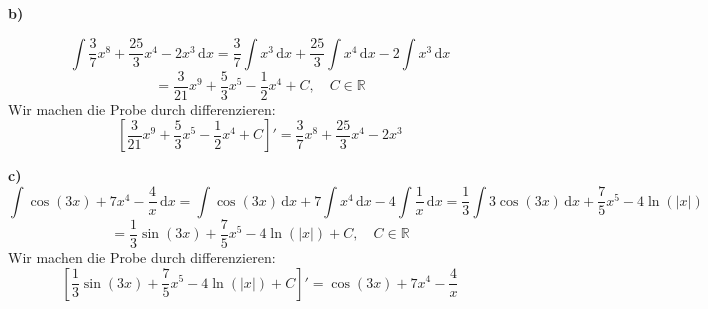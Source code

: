 \documentclass[a4paper,graphics,11pt]{article}
\begin{document}
\textbf{b)}

$$
    \int \frac{3}{7}x^8+\frac{25}{3} x^4-2x^3\, \mathrm{d}x
    = \frac{3}{7}\int x^3\, \mathrm{d}x + \frac{25}{3} \int x^4\, \mathrm{d}x - 2 \int x^3\, \mathrm{d}x
$$$$
    = \frac{3}{21}x^9+\frac{5}{3}x^5-\frac{1}{2}x^4 + C,\quad C \in \mathbb{R}
$$
Wir machen die Probe durch differenzieren:
$$
    \left[\frac{3}{21}x^9+\frac{5}{3}x^5-\frac{1}{2}x^4+C\right]'
    = \frac{3}{7}x^8+\frac{25}{3}x^4-2x^3
$$

\textbf{c)}
$$
    \int \cos(3x)+7x^4-\frac{4}{x}\, \mathrm{d}x
    = \int \cos(3x)\, \mathrm{d}x +7\int x^4\, \mathrm{d}x -4\int \frac{1}{x}\, \mathrm{d}x
    = \frac{1}{3}\int 3\cos(3x)\, \mathrm{d}x +\frac{7}{5}x^5-4\ln(|x|)
$$$$
    = \frac{1}{3}\sin(3x)+\frac{7}{5}x^5-4\ln(|x|) + C,\quad C \in \mathbb{R}
$$
Wir machen die Probe durch differenzieren:
$$
    \left[\frac{1}{3}\sin(3x)+\frac{7}{5}x^5-4\ln(|x|)+C\right]'
    =\cos(3x)+7x^4-\frac{4}{x}
$$
\end{document}
